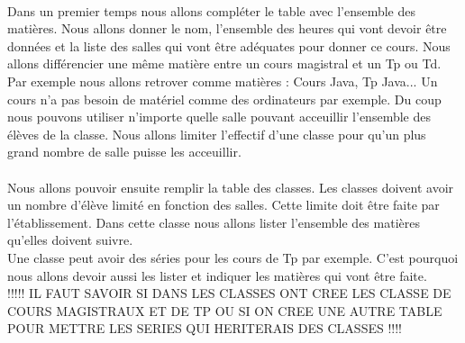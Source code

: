 \documentclass[12]{article}
\begin{document}

		\paragraph{}
		Dans un premier temps nous allons compléter le table avec l'ensemble des matières. Nous allons donner le nom, l'ensemble des heures qui vont devoir être données et la liste des salles qui vont être adéquates pour donner ce cours. Nous allons différencier une même matière entre un cours magistral et un Tp ou Td. Par exemple nous allons retrover comme matières : Cours Java, Tp Java... Un cours n'a pas besoin de matériel comme des ordinateurs par exemple. Du coup nous pouvons utiliser n'importe quelle salle pouvant acceuillir l'ensemble des élèves de la classe. Nous allons limiter l'effectif d'une classe pour qu'un plus grand nombre de salle puisse les acceuillir.

		\paragraph{}
		Nous allons pouvoir ensuite remplir la table des classes. Les classes doivent avoir un nombre d'élève limité en fonction des salles. Cette limite doit être faite par l'établissement. Dans cette classe nous allons lister l'ensemble des matières qu'elles doivent suivre.\\
Une classe peut avoir des séries pour les cours de Tp par exemple. C'est pourquoi nous allons devoir aussi les lister et indiquer les matières qui vont être faite.\\
!!!!! IL FAUT SAVOIR SI DANS LES CLASSES ONT CREE LES CLASSE DE COURS MAGISTRAUX ET DE TP OU SI ON CREE UNE AUTRE TABLE POUR METTRE LES SERIES QUI HERITERAIS DES CLASSES  !!!!
\end{document}
